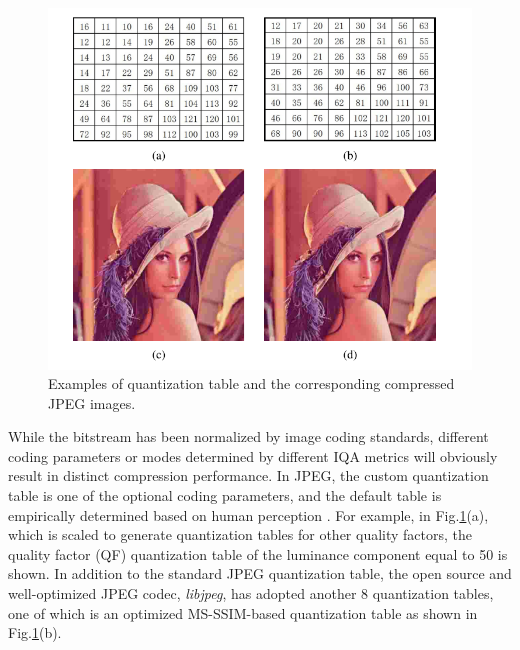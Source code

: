 \begin{figure}[H]
  \includegraphics[width=\linewidth]{figures/jpeg.png}
  \captionsetup{justification=raggedright}
  \caption{Examples of quantization table and the corresponding compressed
JPEG images.} 
  \label{fig:jpeg}

\end{figure}

While the bitstream has been normalized by image coding standards, different coding parameters or modes determined by different IQA metrics will obviously result in distinct compression performance. In JPEG, the custom quantization table is one of the optional coding parameters, and the default table is empirically determined based on human perception \cite{Wallace1992}. For example, in Fig.\ref{fig:jpeg}(a), which is scaled to generate quantization tables for other quality factors, the quality factor (QF) quantization table of the luminance component equal to 50 is shown. In addition to the standard JPEG quantization table, the open source and well-optimized JPEG codec, \emph{libjpeg}, has adopted another 8 quantization tables, one of which is an optimized MS-SSIM-based quantization table as shown in Fig.\ref{fig:jpeg}(b). 


